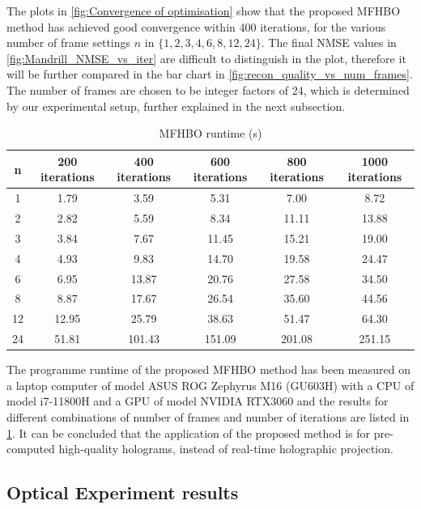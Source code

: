 	The plots in \cref{fig:Convergence of optimisation} show that the proposed MFHBO method has achieved good convergence within 400 iterations, for the various number of frame settings $n$ in $\{1, 2, 3, 4, 6, 8, 12, 24\}$. The final NMSE values in \cref{fig:Mandrill_NMSE_vs_iter} are difficult to distinguish in the plot, therefore it will be further compared in the bar chart in \cref{fig:recon_quality_vs_num_frames}. The number of frames are chosen to be integer factors of $24$, which is determined by our experimental setup, further explained in the next subsection.


	\begin{table}[H]
	\centering
	\begin{tabular}{|c|c|c|c|c|c|}
	\hline
	\textbf{n} & \textbf{200 iterations} & \textbf{400 iterations} & \textbf{600 iterations} & \textbf{800 iterations} & \textbf{1000 iterations} \\ \hline
	1 & 1.79 & 3.59 & 5.31 & 7.00 & 8.72 \\ \hline
	2 & 2.82 & 5.59 & 8.34 & 11.11 & 13.88 \\ \hline
	3 & 3.84 & 7.67 & 11.45 & 15.21 & 19.00 \\ \hline
	4 & 4.93 & 9.83 & 14.70 & 19.58 & 24.47 \\ \hline
	6 & 6.95 & 13.87 & 20.76 & 27.58 & 34.50 \\ \hline
	8 & 8.87 & 17.67 & 26.54 & 35.60 & 44.56 \\ \hline
	12 & 12.95 & 25.79 & 38.63 & 51.47 & 64.30 \\ \hline
	24 & 51.81 & 101.43 & 151.09 & 201.08 & 251.15 \\ \hline
	\end{tabular}
	\caption{MFHBO runtime (s)}
	\label{tab:MFHBO runtime}
	\end{table}

	The programme runtime of the proposed MFHBO method has been measured on a laptop computer of model ASUS ROG Zephyrus M16 (GU603H) with a CPU of model i7-11800H and a GPU of model NVIDIA RTX3060 and the results for different combinations of number of frames and number of iterations are listed in \cref{tab:MFHBO runtime}. It can be concluded that the application of the proposed method is for pre-computed high-quality holograms, instead of real-time holographic projection.



\subsection{Optical Experiment results}

